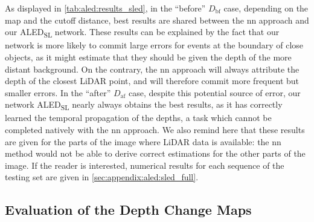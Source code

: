 As displayed in \cref{tab:aled:results_sled}, in the ``before'' \(D_\text{bf}\) case, depending on the map and the cutoff distance, best results are shared between the \acrshort{nn} approach and our ALED\textsubscript{SL} network. These results can be explained by the fact that our network is more likely to commit large errors for events at the boundary of close objects, as it might estimate that they should be given the depth of the more distant background. On the contrary, the \acrshort{nn} approach will always attribute the depth of the closest LiDAR point, and will therefore commit more frequent but smaller errors. In the ``after'' \(D_\text{af}\) case, despite this potential source of error, our network ALED\textsubscript{SL} nearly always obtains the best results, as it has correctly learned the temporal propagation of the depths, a task which cannot be completed natively with the \acrshort{nn} approach. We also remind here that these results are given for the parts of the image where LiDAR data is available: the \acrshort{nn} method would not be able to derive correct estimations for the other parts of the image. If the reader is interested, numerical results for each sequence of the testing set are given in \cref{sec:appendix:aled:sled_full}.

\subsection{Evaluation of the Depth Change Maps}

